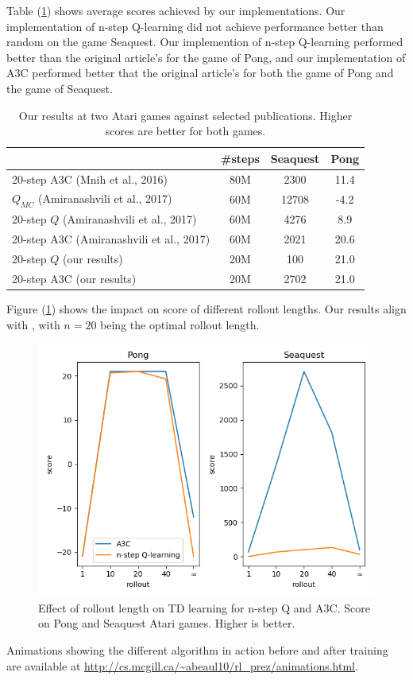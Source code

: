 \documentclass{article}
\begin{document}
Table (\ref{table1}) shows average scores achieved by our implementations. Our
implementation of n-step Q-learning did not achieve performance better than random
on the game Seaquest. Our implemention of n-step Q-learning performed better than
the original article's for the game of Pong, and our implementation of A3C performed
better that the original article's for both the game of Pong and the game of Seaquest.

\begin{table}[H]
\centering
\label{table1}
    \begin{tabular}{@{}l|c|cc}
    \toprule
                                             & \#steps  & Seaquest  & Pong  \\ \midrule
    20-step A3C (Mnih et al., 2016)          & 80M      & 2300      & 11.4  \\ \midrule
    $Q_{MC}$ (Amiranashvili et al., 2017)    & 60M      & 12708     & -4.2  \\
    20-step $Q$ (Amiranashvili et al., 2017) & 60M      & 4276      & 8.9   \\
    20-step A3C (Amiranashvili et al., 2017) & 60M      & 2021      & 20.6  \\ \midrule
    20-step $Q$ (our results)                & 20M      & 100       & 21.0  \\
    20-step A3C (our results)                & 20M      & 2702      & 21.0  \\ \bottomrule
    \end{tabular}
\caption{Our results at two Atari games against selected publications. Higher scores are better for both games.}
\end{table}

Figure (\ref{rollouts}) shows the impact on score of different rollout lengths.
Our results align with \cite{amiranashvili2018analyzing}, with $n=20$ being
the optimal rollout length.

\begin{figure}[H]
    \centering
    \includegraphics[scale=0.75]{results}
    \caption{Effect of rollout length on TD learning for n-step Q and A3C. Score on
    Pong and Seaquest Atari games. Higher is better.}
    \label{rollouts}
\end{figure}

Animations showing the different algorithm in action before and after training
are available at \url{http://cs.mcgill.ca/~abeaul10/rl_prez/animations.html}.



\pagebreak

\small


\end{document}
